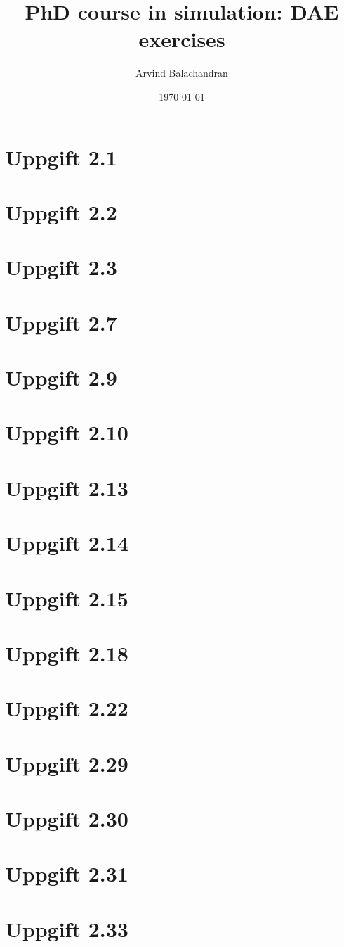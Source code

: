 \documentclass[a4paper]{article}
\title{\Large PhD course in simulation: DAE exercises}
\author{Arvind Balachandran}
\date{\today}
\begin{document}
	
	\maketitle
	\newpage
	\section*{Uppgift 2.1}
	
	\pagebreak
	\section*{Uppgift 2.2}
	
	\pagebreak
	\section*{Uppgift 2.3}
	
	\pagebreak
	\section*{Uppgift 2.7}
	
	\pagebreak
	\section*{Uppgift 2.9}
	
	\pagebreak
	\section*{Uppgift 2.10}
	
	\pagebreak
	\section*{Uppgift 2.13}
	
	\pagebreak
	\section*{Uppgift 2.14}
	
	\pagebreak
	\section*{Uppgift 2.15}
	
	\pagebreak
	\section*{Uppgift 2.18}
	
	\pagebreak
	\section*{Uppgift 2.22}
	
	\pagebreak
	\section*{Uppgift 2.29}
	
	\pagebreak
	\section*{Uppgift 2.30}
	
	\pagebreak
	\section*{Uppgift 2.31}
	
	\pagebreak
	\section*{Uppgift 2.33}
	
	\pagebreak
	
\end{document}
